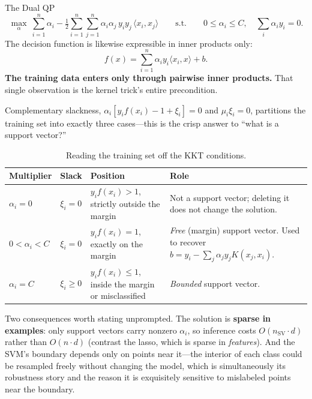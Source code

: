\begin{mathresult}{The Dual QP}
\begin{equation}
\max_{\alpha}\ \sum_{i=1}^n \alpha_i - \tfrac12 \sum_{i=1}^n\sum_{j=1}^n \alpha_i\alpha_j\, y_iy_j\, \langle x_i, x_j\rangle
\qquad\text{s.t.}\qquad 0 \le \alpha_i \le C,\quad \sum_i \alpha_i y_i = 0 .
\end{equation}
The decision function is likewise expressible in inner products only:
\begin{equation}
f(x) = \sum_{i=1}^{n} \alpha_i y_i \langle x_i, x\rangle + b .
\end{equation}
\textbf{The training data enters only through pairwise inner products.} That single observation is the kernel trick's entire precondition.
\end{mathresult}

Complementary slackness, $\alpha_i[y_i f(x_i) - 1 + \xi_i] = 0$ and $\mu_i\xi_i = 0$, partitions the training set into exactly three cases---this is the crisp answer to ``what is a support vector?''

\begin{table}[H]
\centering\small
\caption{Reading the training set off the KKT conditions.}
\label{cml:tab:svm_kkt}
\begin{tabularx}{\textwidth}{@{}l l l X@{}}
\toprule
\textbf{Multiplier} & \textbf{Slack} & \textbf{Position} & \textbf{Role} \\
\midrule
$\alpha_i = 0$ & $\xi_i = 0$ & $y_i f(x_i) > 1$, strictly outside the margin & Not a support vector; deleting it does not change the solution. \\
$0 < \alpha_i < C$ & $\xi_i = 0$ & $y_i f(x_i) = 1$, exactly on the margin & \emph{Free} (margin) support vector. Used to recover $b = y_i - \sum_j \alpha_j y_j K(x_j,x_i)$. \\
$\alpha_i = C$ & $\xi_i \ge 0$ & $y_i f(x_i) \le 1$, inside the margin or misclassified & \emph{Bounded} support vector. \\
\bottomrule
\end{tabularx}
\end{table}

Two consequences worth stating unprompted. The solution is \textbf{sparse in examples}: only support vectors carry nonzero $\alpha_i$, so inference costs $O(n_{\text{SV}} \cdot d)$ rather than $O(n \cdot d)$ (contrast the lasso, which is sparse in \emph{features}). And the SVM's boundary depends only on points near it---the interior of each class could be resampled freely without changing the model, which is simultaneously its robustness story and the reason it is exquisitely sensitive to mislabeled points near the boundary.

